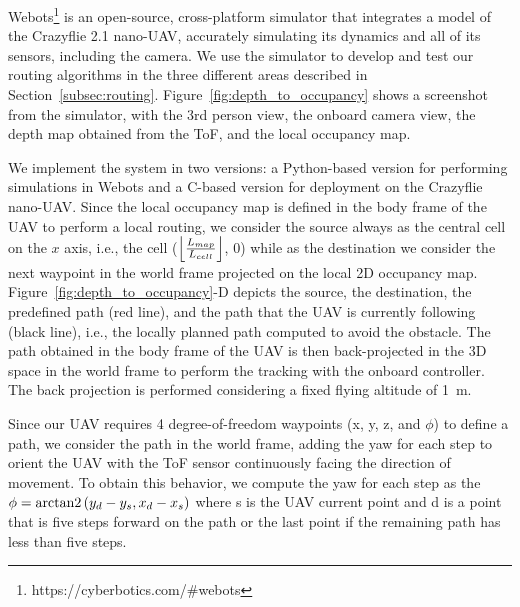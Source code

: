 \label{subsec:sim_env}
Webots\footnote{https://cyberbotics.com/\#webots} is an open-source, cross-platform simulator that integrates a model of the Crazyflie 2.1 nano-UAV, accurately simulating its dynamics and all of its sensors, including the camera. 
We use the simulator to develop and test our routing algorithms in the three different areas described in Section~\ref{subsec:routing}.
Figure~\ref{fig:depth_to_occupancy} shows a screenshot from the simulator, with the 3rd person view, the onboard camera view, the depth map obtained from the ToF, and the local occupancy map.



We implement the system in two versions: a Python-based version for performing simulations in Webots and a C-based version for deployment on the Crazyflie nano-UAV.
Since the local occupancy map is defined in the body frame of the UAV to perform a local routing, we consider the source always as the central cell on the $x$ axis, i.e., the cell ($\floor*{\frac{L_{map}}{L_{cell}}}$, 0) while as the destination we consider the next waypoint in the world frame projected on the local 2D occupancy map.
Figure~\ref{fig:depth_to_occupancy}-D depicts the source, the destination, the predefined path (red line), and the path that the UAV is currently following (black line), i.e., the locally planned path computed to avoid the obstacle.
The path obtained in the body frame of the UAV is then back-projected in the 3D space in the world frame to perform the tracking with the onboard controller. 
The back projection is performed considering a fixed flying altitude of \SI{1}{\meter}.

Since our UAV requires 4 degree-of-freedom waypoints (x, y, z, and $\phi$) to define a path, we consider the path in the world frame, adding the yaw for each step to orient the UAV with the ToF sensor continuously facing the direction of movement.
To obtain this behavior, we compute the yaw for each step as the $\phi=\arctantwo{(y_{d} - y_{s}, x_{d} - x_{s})}$ where s is the UAV current point and d is a point that is five steps forward on the path or the last point if the remaining path has less than five steps.

